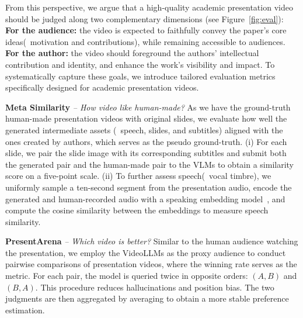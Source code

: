 \vspace{-0.2\baselineskip}
From this perspective, we argue that a high-quality academic presentation video should be judged along two complementary dimensions (see Figure~\ref{fig:eval}):
\textbf{For the audience:}  
the video is expected to faithfully convey the paper’s core ideas(\ie~motivation and contributions), while remaining accessible to audiences.
\textbf{For the author:} the video should foreground the authors’ intellectual contribution and identity, and enhance the work’s visibility and impact.
To systematically capture these goals, we introduce tailored evaluation metrics specifically designed for academic presentation videos. 

\vspace{-0.2\baselineskip}
\noindent\textbf{Meta Similarity} \textit{-- How video like human-made?} 
As we have the ground-truth human-made presentation videos with original slides, we evaluate how well the generated intermediate assets (\ie~speech, slides, and subtitles) aligned with the ones created by authors, which serves as the pseudo ground-truth. 
(i) For each slide, we pair the slide image with its corresponding subtitles and submit both the generated pair and the human-made pair to the VLMs to obtain a similarity score on a five-point scale. 
(ii) To further assess speech(\ie~vocal timbre), we uniformly sample a ten-second segment from the presentation audio, encode the generated and human-recorded audio with a speaking embedding model~\cite{audio_embedding}, and compute the cosine similarity between the embeddings to measure speech similarity.

\vspace{-0.2\baselineskip}
\noindent\textbf{PresentArena} \textit{-- Which video is better?} Similar to the human audience watching the presentation, we employ the VideoLLMs as the proxy audience to conduct pairwise comparisons of presentation videos, where the winning rate serves as the metric. For each pair, the model is queried twice in opposite orders: $(A,B)$ and $(B,A)$. This procedure reduces hallucinations and position bias. The two judgments are then aggregated by averaging to obtain a more stable preference estimation.

